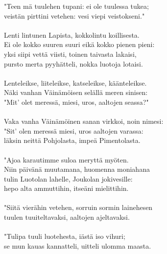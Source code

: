 "Teen mä tuulehen tupani: ei ole tuulessa tukea;          \\
veistän pirttini vetehen: vesi viepi veistokseni."        \\
                                                          \\
Lenti lintunen Lapista, kokkolintu koillisesta.           \\
Ei ole kokko suuren suuri eikä kokko pienen pieni:        \\
yksi siipi vettä viisti, toinen taivasta lakaisi,         \\
pursto merta pyyhätteli, nokka luotoja lotaisi.           \\
                                                          \\
Lenteleikse, liiteleikse, katseleikse, käänteleikse.      \\
Näki vanhan Väinämöisen selällä meren sinisen:            \\
"Mit' olet meressä, miesi, uros, aaltojen seassa?"        \\
                                                          \\
Vaka vanha Väinämöinen sanan virkkoi, noin nimesi:        \\
"Sit' olen meressä miesi, uros aaltojen varassa:          \\
läksin neittä Pohjolasta, impeä Pimentolasta.             \\
                                                          \\
"Ajoa karautimme suloa meryttä myöten.                    \\
Niin päivänä muutamana, huomenna moniahana                \\
tulin Luotolan lahelle, Joukolan jokivesille:             \\
hepo alta ammuttihin, itseäni mielittihin.                \\
                                                          \\
"Siitä vierähin vetehen, sorruin sormin lainehesen        \\
tuulen tuuiteltavaksi, aaltojen ajeltavaksi.              \\
                                                          \\
"Tulipa tuuli luotehesta, iästä iso vihuri;               \\
se mun kauas kannatteli, uitteli ulomma maasta.           \\
